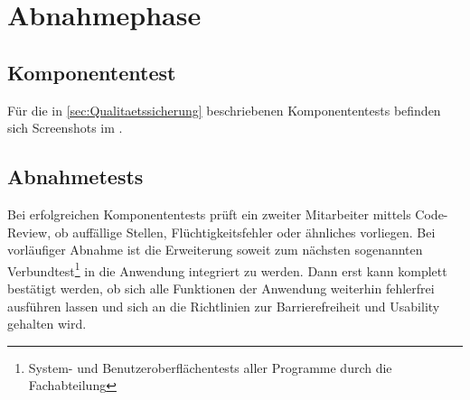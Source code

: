 \section{Abnahmephase} 
\label{sec:Abnahmephase}

\subsection{Komponententest}

Für die in \ref{sec:Qualitaetssicherung} beschriebenen Komponententests befinden sich Screenshots im .

\subsection{Abnahmetests}

Bei erfolgreichen Komponententests prüft ein zweiter Mitarbeiter mittels Code-Review, ob auffällige Stellen, Flüchtigkeitsfehler oder ähnliches vorliegen. Bei vorläufiger Abnahme ist die Erweiterung soweit zum nächsten sogenannten Verbundtest\footnote{System- und Benutzeroberflächentests aller Programme durch die Fachabteilung} in die Anwendung integriert zu werden. Dann erst kann komplett bestätigt werden, ob sich alle Funktionen der Anwendung weiterhin fehlerfrei ausführen lassen und sich an die Richtlinien zur Barrierefreiheit und Usability gehalten wird.

